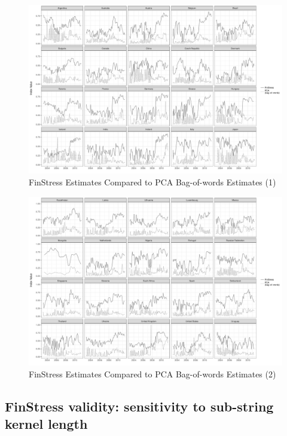 \documentclass[]{article}
\begin{document}
\begin{figure}
	\caption{FinStress Estimates Compared to PCA Bag-of-words Estimates (1)}
    \label{pcaCompare1}
    \begin{center}
    	\includegraphics[scale=0.4]{figures/compare_to_pca_1.pdf}
    \end{center}
\end{figure}

\begin{figure}
	\caption{FinStress Estimates Compared to PCA Bag-of-words Estimates (2)}
    \label{pcaCompare2}
    \begin{center}
    	\includegraphics[scale=0.4]{figures/compare_to_pca_2.pdf}
    \end{center}
\end{figure}


\subsection*{FinStress validity: sensitivity to sub-string kernel length}
\end{document}
